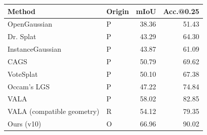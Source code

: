 \begin{tabular}{llrr}
\toprule
Method & Origin & mIoU & Acc.@0.25 \\
\midrule
OpenGaussian \cite{vala} & P & 38.36 & 51.43 \\
Dr. Splat \cite{vala} & P & 43.29 & 64.30 \\
InstanceGaussian \cite{vala} & P & 43.87 & 61.09 \\
CAGS \cite{vala} & P & 50.79 & 69.62 \\
VoteSplat \cite{vala} & P & 50.10 & 67.38 \\
Occam's LGS \cite{vala} & P & 47.22 & 74.84 \\
VALA \cite{vala} & P & 58.02 & 82.85 \\
VALA (compatible geometry) & R & 54.12 & 79.35 \\
Ours (v10) & O & 66.96 & 90.02 \\
\bottomrule
\end{tabular}
